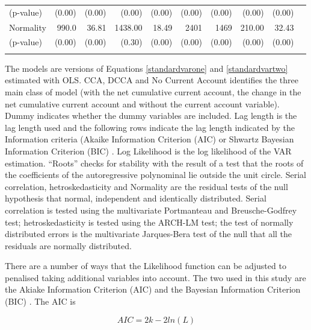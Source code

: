 \documentclass[12pt, a4paper, oneside]{article}\usepackage[]{graphicx}\usepackage[]{color}
\begin{document}
\begin{landscape}
\begin{table}
\begin{threeparttable}
\begin{tabular}{p{5cm}rrrrrrrrr}
  (p-value)                         & (0.00)         & (0.00)       & (0.00) & (0.00)    & (0.00)      & (0.00) & (0.00) & (0.00) \\
Normality              		&990.0	   &  36.81   &  1438.00  &  18.49       &  2401      &  1469   &  210.00       &   32.43   \\
  (p-value)                            &    (0.00)    &   (0.00)   &   (0.30)   &  (0.00)   &  (0.00)   &  (0.00)   &   (0.00)  & (0.00) \\
 \hline
\label{tabref:model}
\end{tabular}
\begin{tablenotes}
\small
\item The models are versions of Equations \ref{standardvarone} and \ref{standardvartwo} estimated with OLS.  CCA, DCCA and No Current Account identifies the three main class of model (with the net cumulative current account, the change in the net cumulative current account and without the current account variable).  Dummy indicates whether the dummy variables are included.  Lag length is the lag length used and the following rows indicate the lag length indicated by the Information criteria (Akaike Information Criterion (AIC) \citep{AIC} or Shwartz Bayesian Information Criterion (BIC) \citep{BIC}.  Log Likelihood is the log likelihood of the VAR estimation.   ``Roots'' checks for stability with the result of a test that the roots of the coefficients of the autoregressive polynominal lie outside the unit circle.   Serial correlation, hetroskedasticity and Normality are the residual tests of the null hypothesis that normal, independent and identically distributed.   Serial correlation is tested using the multivariate Portmanteau and Breusche-Godfrey test; hetroskedasticity is tested using the ARCH-LM test; the test of normally distributed errors is the multivariate Jarques-Bera test of the null that all the residuals are normally distributed. 
\end{tablenotes}
\end{threeparttable}  
\end{table}
\end{landscape}

 There are  a number of ways that the Likelihood function can be adjusted to penalised taking additional variables into account.  The two used in this study are the Akiake Information Criterion (AIC) \citep{AIC} and the Bayesian Information Criterion (BIC) \citep{BIC}.  The AIC is 

\begin{equation}
AIC=2k-2ln(L)
\end{equation}
\end{document}
